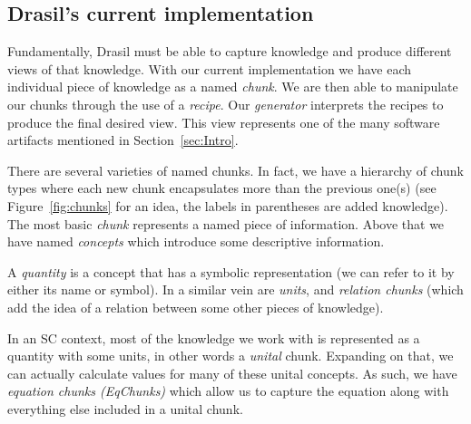 \documentclass[preprint, 10pt]{sigplanconf}
\begin{document}
\subsection{Drasil's current implementation}
\label{subsec:current}

Fundamentally, Drasil must be able to capture knowledge and produce different
views of that knowledge. With our current implementation we have each individual
piece of knowledge as a named \emph{chunk}. We are then able to manipulate our
chunks through the use of a \emph{recipe}. Our \emph{generator} interprets the
recipes to produce the final desired view. This view represents one of the many
software artifacts mentioned in Section~\ref{sec:Intro}.

There are several varieties of named chunks. In fact, we have a hierarchy of
chunk types where each new chunk encapsulates more than the previous one(s) (see
Figure~\ref{fig:chunks} for an idea, the labels in parentheses are added
knowledge). The most basic \emph{chunk} represents a named piece of information.
Above that we have named \emph{concepts} which introduce some descriptive
information.

A \emph{quantity} is a concept that has a symbolic representation (we can refer
to it by either its name or symbol). In a similar vein are \emph{units}, 
and \emph{relation chunks} (which add the idea of a relation between some other
pieces of knowledge).

In an SC context, most of the knowledge we work with is represented as a
quantity with some units, in other words a \emph{unital} chunk. Expanding on
that, we can actually calculate values for many of these unital concepts. As
such, we have \emph{equation chunks (EqChunks)} which allow us to capture the
equation along with everything else included in a unital chunk.
\end{document}
